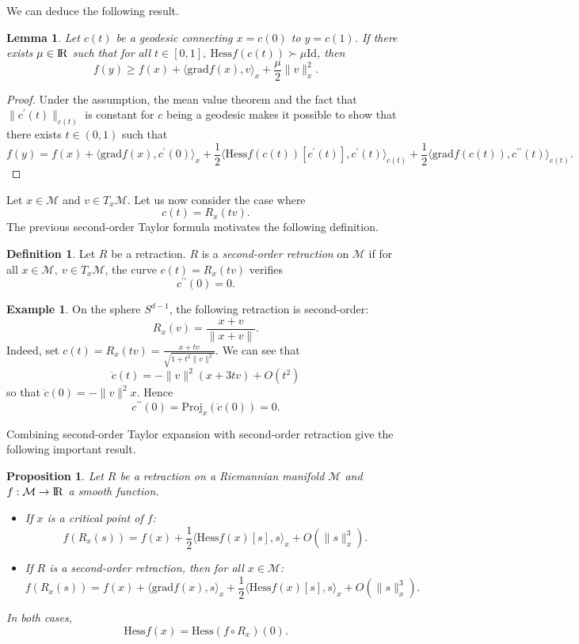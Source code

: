 \documentclass[10pt,a4paper]{book}
\theoremstyle{definition}
\newtheorem{defn}{Definition}[section]
\newtheorem{exm}{Example}[section]
\theoremstyle{plain}
\newtheorem{prop}{Proposition}[section]
\newtheorem{lma}{Lemma}[section]
\theoremstyle{remark}
\newcommand{\grad}{\textrm{grad}}
\newcommand \M {\mathcal{M}}
\def\R{{\rm I\kern-0.16em R}}
\begin{document}
We can deduce the following result.
\begin{lma}
Let $c(t)$ be a geodesic connecting $x=c(0)$ to $y=c(1)$. If there exists $\mu \in \R$ such that for all $t\in [0,1],~\text{Hess} f(c(t)) \succ \mu \text{Id}$, then
$$f(y)\ge f(x)+\langle \grad f(x),v\rangle_x+\frac{\mu}{2}\|v\|_x^2.$$
\end{lma}
\begin{proof}
Under the assumption, the mean value theorem and the fact that $\|c^{\prime}(t)\|_{c(t)}$ is constant for $c$ being a geodesic makes it possible to show that there exists $t\in (0,1)$ such that
$$f(y)=f(x)+\langle \grad f(x),c^{\prime}(0)\rangle_x+\frac{1}{2}\langle \text{Hess}f(c(t))[c^{\prime}(t)],c^{\prime}(t)\rangle_{c(t)}+\frac{1}{2}\langle \grad f(c(t)),c^{\prime \prime}(t)\rangle_{c(t)}.$$
\end{proof}
Let $x\in \M$ and $v\in T_x\M$. Let us now consider the case where 
$$c(t)=R_x(tv).$$
The previous second-order Taylor formula motivates the following definition.
\begin{defn}
Let $R$ be a retraction. $R$ is a \emph{second-order retraction} on $\M$ if for all $x\in \M,~v\in T_x\M$, the curve $c(t)=R_x(tv)$ verifies
$$c^{\prime \prime}(0)=0.$$
\end{defn}
\begin{exm}
On the sphere $S^{d-1}$, the following retraction is second-order:
$$R_x(v)=\frac{x+v}{\|x+v\|}.$$
Indeed, set $c(t)=R_x(tv)=\frac{x+tv}{\sqrt{1+t^2\|v\|^2}}$. We can see that
$$\ddot{c}(t)=-\|v\|^2(x+3tv)+O(t^2)$$
so that $\ddot{c}(0)=-\|v\|^2x$. Hence
$$c^{\prime \prime}(0)=\text{Proj}_x(\ddot{c}(0))=0.$$
\end{exm}

Combining second-order Taylor expansion with second-order retraction give the following important result.
\begin{prop}
Let $R$ be a retraction on a Riemannian manifold $\M$ and $f:\M \to \R$ a smooth function. 
\begin{itemize}
\item If $x$ is a critical point of $f$:
$$f(R_x(s))=f(x)+\frac{1}{2}\langle \text{Hess}f(x)[s],s\rangle_x+O(\|s\|_x^3).$$
\item If $R$ is a second-order retraction, then for all $x\in \M$:
$$f(R_x(s))=f(x)+\langle \grad f(x),s\rangle_x+\frac{1}{2}\langle \text{Hess}f(x)[s],s\rangle_x+O(\|s\|_x^3).$$
\end{itemize}
In both cases,
$$\text{Hess}f(x)=\text{Hess}(f\circ R_x)(0).$$
\end{prop}
\end{document}
